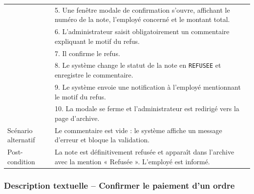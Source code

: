 \documentclass[12pt,a4paper]{report}
\begin{document}
\begin{longtable}{|p{3.5cm}|p{11cm}|}
& 5. Une fenêtre modale de confirmation s'ouvre, affichant le numéro de la note, l'employé concerné et le montant total. \\

& 6. L'administrateur saisit obligatoirement un commentaire expliquant le motif du refus. \\

& 7. Il confirme le refus. \\

& 8. Le système change le statut de la note en \texttt{REFUSEE} et enregistre le commentaire. \\

& 9. Le système envoie une notification à l'employé mentionnant le motif du refus. \\

& 10. La modale se ferme et l'administrateur est redirigé vers la page d'archive. \\

\hline

Scénario alternatif & Le commentaire est vide : le système affiche un message d'erreur et bloque la validation. \\

\hline

Post-condition & La note est définitivement refusée et apparaît dans l'archive avec la mention « Refusée ». L'employé est informé. \\

\hline

\end{longtable}





\subsubsection{Description textuelle – Confirmer le paiement d'un ordre}


\label{tab:confirm_payment_desc}
\end{document}

